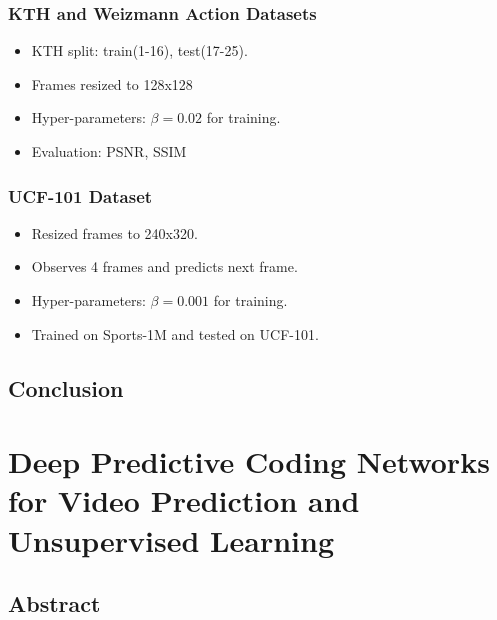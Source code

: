 \documentclass{article}
\begin{document}
    \subsubsection{KTH and Weizmann Action Datasets}\label{subsubsec:Decomposing_Motion_and_Content_for_Natural_Video_Sequence_Prediction:kth-and-weizmann-action-datasets}
    \begin{itemize}
        \item KTH split: train(1-16), test(17-25).
        \item Frames resized to 128x128
        \item Hyper-parameters: $\beta = 0.02$ for training.
        \item Evaluation: PSNR, SSIM
    \end{itemize}

    \subsubsection{UCF-101 Dataset}\label{subsubsec:Decomposing_Motion_and_Content_for_Natural_Video_Sequence_Prediction:ucf-101-dataset}
    \begin{itemize}
        \item Resized frames to 240x320.
        \item Observes 4 frames and predicts next frame.
        \item Hyper-parameters: $\beta = 0.001$ for training.
        \item Trained on Sports-1M and tested on UCF-101.
    \end{itemize}

    \subsection{Conclusion}\label{subsec:Decomposing_Motion_and_Content_for_Natural_Video_Sequence_Prediction:conclusion}

    \newpage


    \section{Deep Predictive Coding Networks for Video Prediction and Unsupervised Learning}\label{sec:Deep_Predictive_Coding_Networks_for_Video_Prediction_and_Unsupervised_Learning}
    \subsection*{Abstract}
\end{document}
